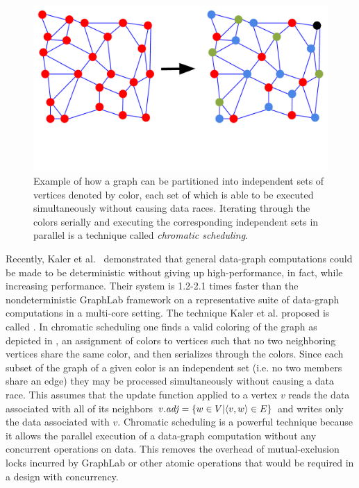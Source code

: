 \begin{figure}[!h]
\centering
\includegraphics[width=4.5in,clip,trim=0 3cm 0 0]{figures/chromatic_scheduling.pdf}
\caption{Example of how a graph can be partitioned into 
independent sets of vertices denoted by color, each set of which is able to
be executed simultaneously without causing data races.  Iterating
through the colors serially and executing the corresponding
independent sets in parallel is a technique called \emph{chromatic scheduling}.}
\label{fig:chromatic_scheduling}
\end{figure}

Recently, Kaler et al.~\cite{KalerHaSc14} demonstrated that general
data-graph computations could be made to be deterministic without
giving up high-performance, in fact, while increasing performance.
Their system  is 1.2-2.1 times faster than
the nondeterministic GraphLab framework on a representative suite of data-graph
computations in a multi-core setting.  The technique Kaler et al. proposed
is called .  In chromatic scheduling one
finds a valid coloring of the graph as depicted in 
, an assignment of colors to 
vertices such that no two neighboring vertices share the same color,
and then serializes through the colors.  Since each subset of the graph
of a given color is an independent set (i.e. no two members share an
edge) they may be processed simultaneously without causing a data race.
This assumes that the update function applied to a vertex $v$ reads
the data associated with all of its neighbors 
$\attrib{v}{\id{adj}} = \set{w \in V | \langle v, w \rangle \in E}$ 
and writes only the data
associated with $v$.  Chromatic scheduling is a powerful technique
because it allows the parallel execution of a data-graph computation
without any concurrent operations on data.  This removes the overhead
of mutual-exclusion locks incurred by GraphLab or other atomic operations
that would be required in a design with concurrency.

